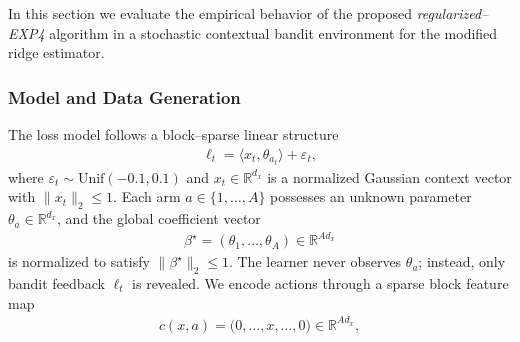 \documentclass[11pt,letterpaper]{article}
\newcommand{\loss}{\ell}
\theoremstyle{plain}
\theoremstyle{definition}  %
\begin{document}
In this section we evaluate the empirical behavior of the proposed \emph{regularized–EXP4} algorithm in a stochastic contextual bandit environment for the modified ridge estimator. 


\subsubsection*{Model and Data Generation}


\noindent The loss model follows a block–sparse linear structure
\begin{align*}
    \loss_t = \langle x_t , \theta_{a_t} \rangle + \varepsilon_t,
\end{align*}
where $\varepsilon_t\sim\text{Unif}(-0.1,0.1)$ and $x_t\in\mathbb{R}^{d_x}$ is a normalized Gaussian context vector with $\|x_t\|_2 \le 1$. Each arm $a\in\{1,\dots,A\}$ possesses an unknown parameter $\theta_a\in\mathbb{R}^{d_x}$, and the global coefficient vector
\begin{align*}
    \beta^\star = (\theta_1,\dots,\theta_A) \in \mathbb{R}^{A d_x}
\end{align*}
is normalized to satisfy $\|\beta^\star\|_2 \le 1$. The learner never observes $\theta_a$; instead, only bandit feedback $\loss_t$ is revealed. We encode actions through a sparse block feature map
\begin{align*}
    c(x,a) = \big(0,\dots,x,\dots,0\big) \in \mathbb{R}^{A d_x},
\end{align*}
\end{document}

